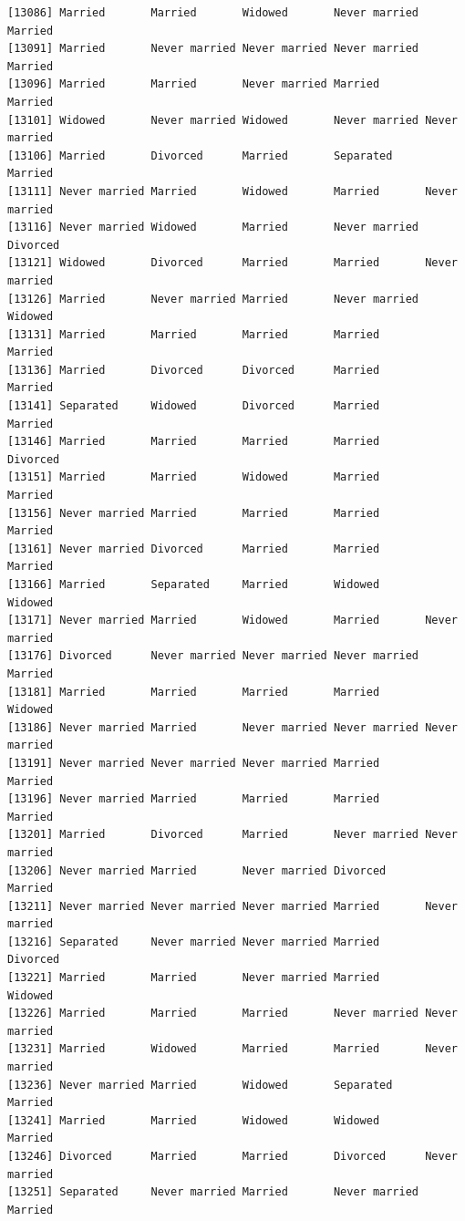 \documentclass[
  letterpaper,
  DIV=11,
  numbers=noendperiod,
  oneside]{scrartcl}
\begin{document}
\begin{verbatim}
[13086] Married       Married       Widowed       Never married Married      
[13091] Married       Never married Never married Never married Married      
[13096] Married       Married       Never married Married       Married      
[13101] Widowed       Never married Widowed       Never married Never married
[13106] Married       Divorced      Married       Separated     Married      
[13111] Never married Married       Widowed       Married       Never married
[13116] Never married Widowed       Married       Never married Divorced     
[13121] Widowed       Divorced      Married       Married       Never married
[13126] Married       Never married Married       Never married Widowed      
[13131] Married       Married       Married       Married       Married      
[13136] Married       Divorced      Divorced      Married       Married      
[13141] Separated     Widowed       Divorced      Married       Married      
[13146] Married       Married       Married       Married       Divorced     
[13151] Married       Married       Widowed       Married       Married      
[13156] Never married Married       Married       Married       Married      
[13161] Never married Divorced      Married       Married       Married      
[13166] Married       Separated     Married       Widowed       Widowed      
[13171] Never married Married       Widowed       Married       Never married
[13176] Divorced      Never married Never married Never married Married      
[13181] Married       Married       Married       Married       Widowed      
[13186] Never married Married       Never married Never married Never married
[13191] Never married Never married Never married Married       Married      
[13196] Never married Married       Married       Married       Married      
[13201] Married       Divorced      Married       Never married Never married
[13206] Never married Married       Never married Divorced      Married      
[13211] Never married Never married Never married Married       Never married
[13216] Separated     Never married Never married Married       Divorced     
[13221] Married       Married       Never married Married       Widowed      
[13226] Married       Married       Married       Never married Never married
[13231] Married       Widowed       Married       Married       Never married
[13236] Never married Married       Widowed       Separated     Married      
[13241] Married       Married       Widowed       Widowed       Married      
[13246] Divorced      Married       Married       Divorced      Never married
[13251] Separated     Never married Married       Never married Married      

\end{verbatim}
\end{document}
